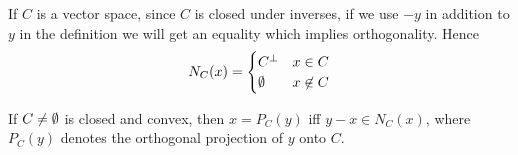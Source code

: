 \documentclass[class=article,crop=false]{standalone}
\begin{document}
\begin{eg}
If $ C$ is a vector space, since $ C$ is closed under inverses, if we use  $ -y$ in addition to $ y$ in the definition we will get an equality which implies orthogonality. Hence
 \begin{equation*}
	 N_C(x)=
\begin{cases}
	C^{\perp} & x \in C\\
	\emptyset & x \not\in C
\end{cases}
\end{equation*}
\end{eg}

\begin{prop}[6.47 BC17]
	If $ C \neq \emptyset$ is closed and convex, then $ x=P_C(y)$ iff  $ y-x \in N_C(x)$, where $ P_C(y)$ denotes the orthogonal projection of  $ y$ onto  $ C$.
\end{prop}
\end{document}
